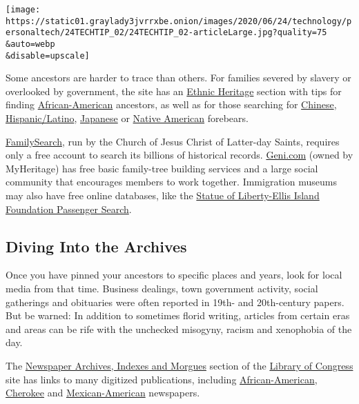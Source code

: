 \texttt{[image: https://static01.graylady3jvrrxbe.onion/images/2020/06/24/technology/personaltech/24TECHTIP\_02/24TECHTIP\_02-articleLarge.jpg?quality=75\\\&auto=webp\\\&disable=upscale]}

Some ancestors are harder to trace than others. For families severed by
slavery or overlooked by government, the site has an
\href{https://www.archives.gov/research/genealogy/ethnic-heritage}{Ethnic
Heritage} section with tips for finding
\href{https://www.archives.gov/research/african-americans\#toc-online-resources}{African-American}
ancestors, as well as for those searching for
\href{https://www.archives.gov/research/chinese-americans}{Chinese},
\href{https://www.archives.gov/research/hispanic}{Hispanic/Latino},
\href{https://www.archives.gov/research/japanese-americans}{Japanese} or
\href{https://www.archives.gov/research/native-americans}{Native
American} forebears.

\href{https://www.familysearch.org/en/}{FamilySearch}, run by the Church
of Jesus Christ of Latter-day Saints, requires only a free account to
search its billions of historical records.
\href{https://www.geni.com}{Geni.com} (owned by MyHeritage) has free
basic family-tree building services and a large social community that
encourages members to work together. Immigration museums may also have
free online databases, like the
\href{https://www.libertyellisfoundation.org/passenger}{Statue of
Liberty-Ellis Island Foundation Passenger Search}.

\hypertarget{diving-into-the-archives}{%
\subsection{Diving Into the Archives}\label{diving-into-the-archives}}

Once you have pinned your ancestors to specific places and years, look
for local media from that time. Business dealings, town government
activity, social gatherings and obituaries were often reported in 19th-
and 20th-century papers. But be warned: In addition to sometimes florid
writing, articles from certain eras and areas can be rife with the
unchecked misogyny, racism and xenophobia of the day.

The \href{http://www.loc.gov/rr/news/oltitles.html}{Newspaper Archives,
Indexes and Morgues} section of the \href{https://www.loc.gov}{Library
of Congress} site has links to many digitized publications, including
\href{https://chroniclingamerica.loc.gov/newspapers/?state=\&ethnicity=African+American\&language=}{African-American},
\href{https://www.wdl.org/en/search/?collection=cherokee-phoenix-and-indians-advocate-newspaper\&grouping=15576}{Cherokee}
and
\href{http://contentdm-landing.library.arizona.edu/contentdm/mmap/}{Mexican-American}
newspapers.

